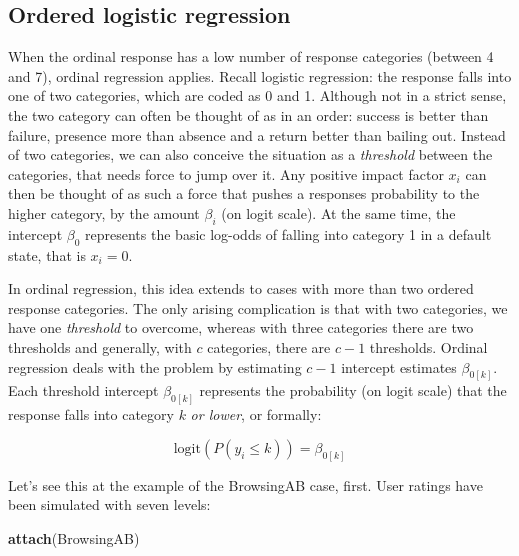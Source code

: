 \documentclass[]{svmono}
\newenvironment{Shaded}{\begin{snugshade}}{\end{snugshade}}
\newcommand{\KeywordTok}[1]{\textcolor[rgb]{0.13,0.29,0.53}{\textbf{#1}}}
\newcommand{\DataTypeTok}[1]{\textcolor[rgb]{0.13,0.29,0.53}{#1}}
\newcommand{\DecValTok}[1]{\textcolor[rgb]{0.00,0.00,0.81}{#1}}
\newcommand{\StringTok}[1]{\textcolor[rgb]{0.31,0.60,0.02}{#1}}
\newcommand{\OperatorTok}[1]{\textcolor[rgb]{0.81,0.36,0.00}{\textbf{#1}}}
\newcommand{\NormalTok}[1]{#1}
\theoremstyle{definition}
\theoremstyle{definition}
\theoremstyle{definition}
\theoremstyle{remark}
\begin{document}
\subsection{Ordered logistic
regression}\label{ordered-logistic-regression}

When the ordinal response has a low number of response categories
(between 4 and 7), ordinal regression applies. Recall logistic
regression: the response falls into one of two categories, which are
coded as 0 and 1. Although not in a strict sense, the two category can
often be thought of as in an order: success is better than failure,
presence more than absence and a return better than bailing out. Instead
of two categories, we can also conceive the situation as a
\emph{threshold} between the categories, that needs force to jump over
it. Any positive impact factor \(x_i\) can then be thought of as such a
force that pushes a responses probability to the higher category, by the
amount \(\beta_i\) (on logit scale). At the same time, the intercept
\(\beta_0\) represents the basic log-odds of falling into category 1 in
a default state, that is \(x_i = 0\).

In ordinal regression, this idea extends to cases with more than two
ordered response categories. The only arising complication is that with
two categories, we have one \emph{threshold} to overcome, whereas with
three categories there are two thresholds and generally, with \(c\)
categories, there are \(c - 1\) thresholds. Ordinal regression deals
with the problem by estimating \(c - 1\) intercept estimates
\(\beta_{0[k]}\). Each threshold intercept \(\beta_{0[k]}\) represents
the probability (on logit scale) that the response falls into category
\(k\) \emph{or lower}, or formally:

\[
\text{logit}(P(y_i \leq k)) = \beta_{0[k]}
\]

Let's see this at the example of the BrowsingAB case, first. User
ratings have been simulated with seven levels:

\begin{Shaded}
\begin{Highlighting}[]
\KeywordTok{attach}\NormalTok{(BrowsingAB)}
\end{Highlighting}
\end{Shaded}

\begin{Shaded}
\end{Shaded}
\end{document}
